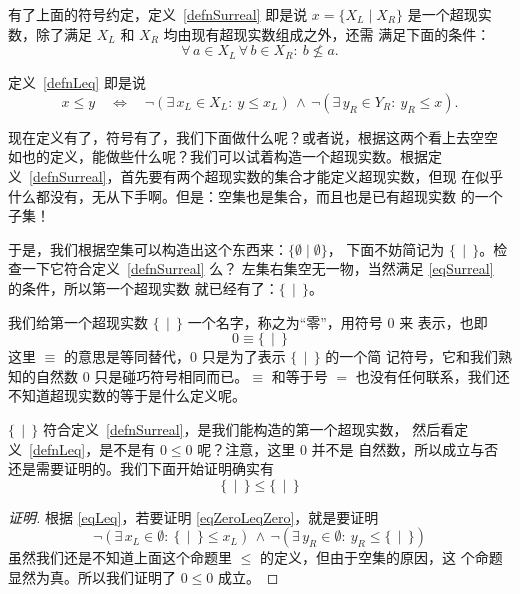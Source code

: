\documentclass[cs4size,a4paper,adobefonts]{ctexart}
\numberwithin{equation}{section}
\begin{document}
有了上面的符号约定，定义~\ref{defnSurreal} 即是说 $x=\{X_L \mid X_R\}$
是一个超现实数，除了满足 $X_L$ 和 $X_R$ 均由现有超现实数组成之外，还需
满足下面的条件：
\begin{equation}
  \label{eqSurreal}
  \forall\, a \in X_L \,\forall\, b \in X_R:\: b\nleq a.
\end{equation}

定义~\ref{defnLeq} 即是说
\begin{equation}
  \label{eqLeq}
  x \leq y \quad\Leftrightarrow\quad
  \neg(\exists\, x_L \in X_L :\: y \leq x_L)\, \wedge \,
  \neg(\exists\, y_R \in Y_R :\: y_R \leq x).
\end{equation}

现在定义有了，符号有了，我们下面做什么呢？或者说，根据这两个看上去空空
如也的定义，能做些什么呢？我们可以试着构造一个超现实数。根据定
义~\ref{defnSurreal}，首先要有两个超现实数的集合才能定义超现实数，但现
在似乎什么都没有，无从下手啊。但是：空集也是集合，而且也是已有超现实数
的一个子集！

于是，我们根据空集可以构造出这个东西来：$\{\emptyset\mid\emptyset\}$，
下面不妨简记为 $\{\,\mid\,\}$。检查一下它符合定义~\ref{defnSurreal} 么？
左集右集空无一物，当然满足 \eqref{eqSurreal} 的条件，所以第一个超现实数
就已经有了：$\{\,\mid\,\}$。

我们给第一个超现实数 $\{\,\mid\,\}$ 一个名字，称之为“零”，用符号 $0$ 来
表示，也即
\begin{equation}
  0 \equiv \{\,\mid\,\}
\end{equation}
这里 $\equiv$ 的意思是等同替代，0 只是为了表示 $\{\,\mid\,\}$ 的一个简
记符号，它和我们熟知的自然数 0 只是碰巧符号相同而已。$\equiv$ 和等于号
$=$ 也没有任何联系，我们还不知道超现实数的等于是什么定义呢。

$\{\,\mid\,\}$ 符合定义~\ref{defnSurreal}，是我们能构造的第一个超现实数，
然后看定义~\ref{defnLeq}，是不是有 $0 \leq 0$ 呢？注意，这里 $0$ 并不是
自然数，所以成立与否还是需要证明的。我们下面开始证明确实有
\begin{equation}
  \label{eqZeroLeqZero}
  \{\,\mid\,\}\leq\{\,\mid\,\}
\end{equation}

\begin{proof}[证明]
  根据 \eqref{eqLeq}，若要证明 \eqref{eqZeroLeqZero}，就是要证明
  \[
  \neg(\exists\,x_L\in\emptyset:\:\{\,\mid\,\}\leq x_L)\,\wedge\,
  \neg(\exists\,y_R\in\emptyset:\:y_R\leq\{\,\mid\,\})
  \]
  虽然我们还是不知道上面这个命题里 $\leq$ 的定义，但由于空集的原因，这
  个命题显然为真。所以我们证明了 $0\leq0$ 成立。
\end{proof}
\end{document}
